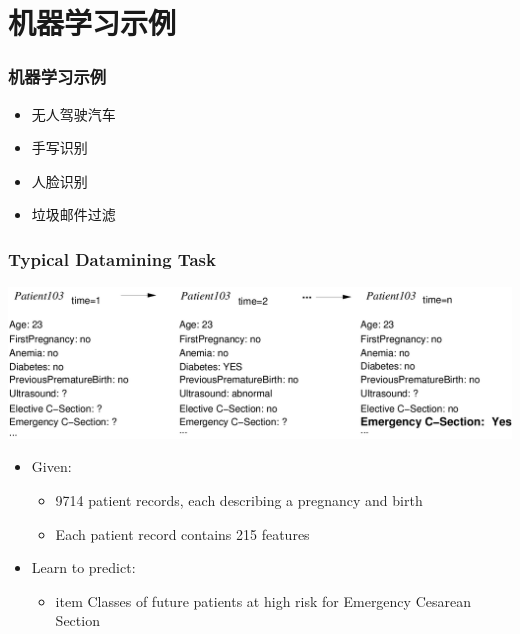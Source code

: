\documentclass{beamer}
\begin{document}
\section{机器学习示例}
\label{sec-2}
\begin{frame}
\frametitle{机器学习示例}
\label{sec-2-1}

\begin{itemize}
\item 无人驾驶汽车
\item 手写识别
\item 人脸识别
\item 垃圾邮件过滤
\end{itemize}
\end{frame}
\begin{frame}
\frametitle{Typical Datamining Task}
\label{sec-2-2}


\includegraphics[width=.9\linewidth]{./image/csec.png}

\begin{itemize}
\item Given:
\begin{itemize}
\item 9714 patient records, each describing a pregnancy and birth
\item Each patient record contains 215 features
\end{itemize}
\item Learn to predict:
\begin{itemize}
\item item Classes of future patients at high risk for Emergency Cesarean Section
\end{itemize}
\end{itemize}
\end{frame}
\end{document}
